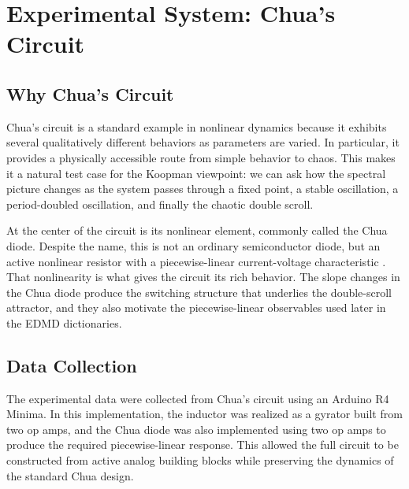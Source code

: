 \documentclass[11pt]{article}
\begin{document}
\section{Experimental System: Chua's Circuit}

\subsection{Why Chua's Circuit}
Chua's circuit is a standard example in nonlinear dynamics because it exhibits several qualitatively different behaviors as parameters are varied. In particular, it provides a physically accessible route from simple behavior to chaos. This makes it a natural test case for the Koopman viewpoint: we can ask how the spectral picture changes as the system passes through a fixed point, a stable oscillation, a period-doubled oscillation, and finally the chaotic double scroll.

At the center of the circuit is its nonlinear element, commonly called the Chua diode. Despite the name, this is not an ordinary semiconductor diode, but an active nonlinear resistor with a piecewise-linear current-voltage characteristic \citep{chua1986,matsumoto1985}. That nonlinearity is what gives the circuit its rich behavior. The slope changes in the Chua diode produce the switching structure that underlies the double-scroll attractor, and they also motivate the piecewise-linear observables used later in the EDMD dictionaries.

\subsection{Data Collection}
The experimental data were collected from Chua's circuit using an Arduino R4 Minima. In this implementation, the inductor was realized as a gyrator built from two op amps, and the Chua diode was also implemented using two op amps to produce the required piecewise-linear response. This allowed the full circuit to be constructed from active analog building blocks while preserving the dynamics of the standard Chua design.
\end{document}
